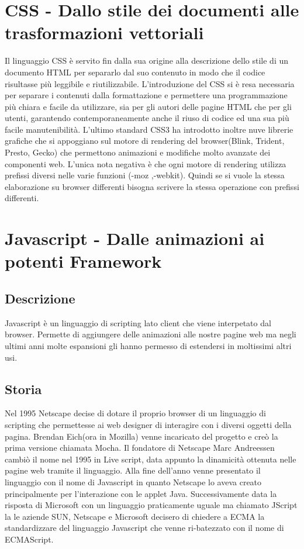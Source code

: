 \section{CSS - Dallo stile dei documenti alle trasformazioni vettoriali}
Il linguaggio CSS è servito fin dalla sua origine alla descrizione dello stile di un documento HTML per separarlo dal suo contenuto in modo che il codice risultasse più leggibile e riutilizzabile.
L’introduzione del CSS si è resa necessaria per separare i contenuti dalla formattazione e permettere una programmazione più chiara e facile da utilizzare, sia per gli autori delle pagine HTML che per gli utenti, garantendo contemporaneamente anche il riuso di codice ed una sua più facile manutenibilità.
L'ultimo standard CSS3 ha introdotto inoltre nuve librerie grafiche che si appoggiano sul motore di rendering del browser(Blink, Trident, Presto, Gecko) che permettono animazioni e modifiche molto avanzate dei componenti web.
L'unica nota negativa è che ogni motore di rendering utilizza prefissi diversi nelle varie funzioni (-moz ,-webkit). Quindi se si vuole la stessa elaborazione su browser differenti bisogna scrivere la stessa operazione con prefissi differenti.

\section{Javascript - Dalle animazioni ai potenti Framework}
\subsection{Descrizione}
Javascript è un linguaggio di scripting lato client che viene interpetato dal browser. Permette di aggiungere delle animazioni alle nostre pagine web ma negli ultimi anni molte espansioni gli hanno permesso di estendersi in moltissimi altri usi.
\subsection{Storia}
Nel 1995 Netscape decise di dotare il proprio browser di un linguaggio di scripting che permettesse ai web designer di interagire con i diversi oggetti della pagina. Brendan Eich(ora in Mozilla) venne incaricato del progetto e creò la prima versione chiamata Mocha. Il fondatore di Netscape Marc Andreessen cambiò il nome nel 1995 in Live script, data appunto la dinamicità ottenuta nelle pagine web tramite il linguaggio. Alla fine dell'anno venne presentato il linguaggio con il nome di Javascript in quanto Netscape lo aveva creato principalmente per l'interazione con le applet Java.
Successivamente data la risposta di Microsoft con un linguaggio praticamente uguale ma chiamato JScript la le aziende SUN, Netscape e Microsoft decisero di chiedere a ECMA la standardizzare del linguaggio Javascript che venne ri-batezzato con il nome di ECMAScript.
